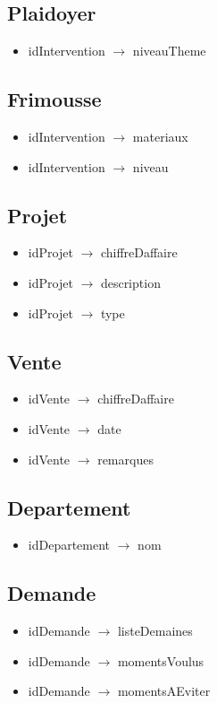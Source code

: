 \documentclass[asi, sansVersion]{picInsa}
\begin{document}
\subsection*{Plaidoyer}
\begin{itemize}
\item[]	idIntervention $\rightarrow$ niveauTheme
\end{itemize}

\subsection*{Frimousse}
\begin{itemize}
\item[]	idIntervention $\rightarrow$ materiaux
\item[] idIntervention $\rightarrow$ niveau
\end{itemize}

\subsection*{Projet}
\begin{itemize}
\item[] idProjet $\rightarrow$ chiffreDaffaire
\item[] idProjet $\rightarrow$ description
\item[] idProjet $\rightarrow$ type
\end{itemize}

\subsection*{Vente}
\begin{itemize}
\item[]	idVente $\rightarrow$ chiffreDaffaire
\item[]	idVente $\rightarrow$ date
\item[]	idVente $\rightarrow$ remarques
\end{itemize}

\subsection*{Departement}
\begin{itemize}
\item[] idDepartement $\rightarrow$ nom
\end{itemize}

\subsection*{Demande}
\begin{itemize}
\item[] idDemande $\rightarrow$ listeDemaines 
\item[] idDemande $\rightarrow$ momentsVoulus
\item[] idDemande $\rightarrow$ momentsAEviter
\end{itemize}
 
\end{document}
